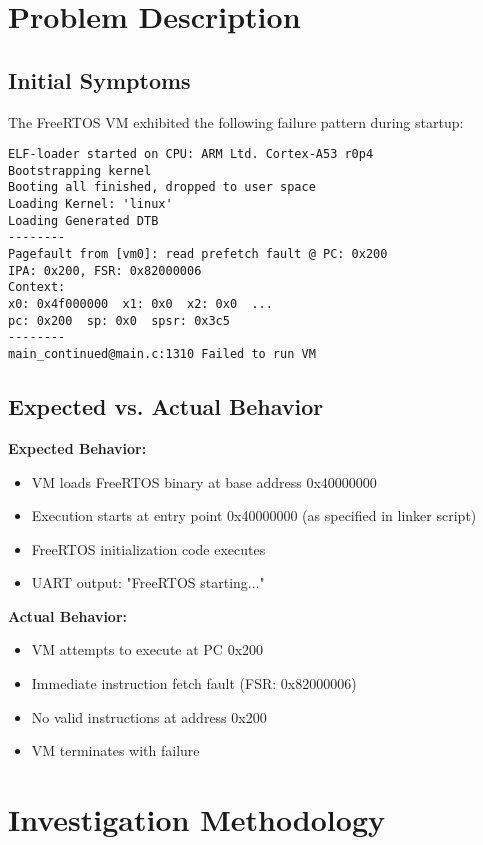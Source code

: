 \documentclass[11pt,a4paper]{article}
\begin{document}
\section{Problem Description}

\subsection{Initial Symptoms}

The FreeRTOS VM exhibited the following failure pattern during startup:

\begin{lstlisting}[caption=VM Failure Output]
ELF-loader started on CPU: ARM Ltd. Cortex-A53 r0p4
Bootstrapping kernel
Booting all finished, dropped to user space
Loading Kernel: 'linux'
Loading Generated DTB
--------
Pagefault from [vm0]: read prefetch fault @ PC: 0x200 
IPA: 0x200, FSR: 0x82000006
Context:
x0: 0x4f000000  x1: 0x0  x2: 0x0  ...
pc: 0x200  sp: 0x0  spsr: 0x3c5
--------
main_continued@main.c:1310 Failed to run VM
\end{lstlisting}

\subsection{Expected vs. Actual Behavior}

\textbf{Expected Behavior:}
\begin{itemize}
\item VM loads FreeRTOS binary at base address 0x40000000
\item Execution starts at entry point 0x40000000 (as specified in linker script)
\item FreeRTOS initialization code executes
\item UART output: "FreeRTOS starting..."
\end{itemize}

\textbf{Actual Behavior:}
\begin{itemize}
\item VM attempts to execute at PC 0x200
\item Immediate instruction fetch fault (FSR: 0x82000006)
\item No valid instructions at address 0x200
\item VM terminates with failure
\end{itemize}

\section{Investigation Methodology}
\end{document}
